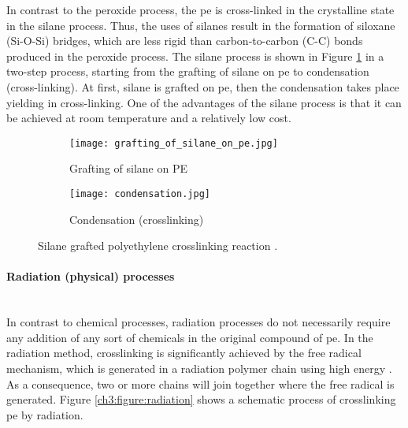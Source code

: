 In contrast to the peroxide process, the \acrshort{pe} is cross-linked in the crystalline state in the silane process. Thus, the uses of silanes result in the formation of siloxane (Si-O-Si) bridges, which are less rigid than carbon-to-carbon (C-C) bonds produced in the peroxide process. The silane process is shown in Figure \ref{ch3:figure:reaction} in a two-step process, starting from the grafting of silane on \acrshort{pe} to condensation (cross-linking). At first, silane is grafted on \acrshort{pe}, then the condensation takes place yielding in cross-linking. One of the advantages of the silane process is that it can be achieved at room temperature and a relatively low cost.

\begin{figure}[H]
\captionsetup[subfigure]{justification=raggedright}
\centering

\begin{subfigure}{.9\textwidth}
    \centering
    \texttt{[image: grafting\_of\_silane\_on\_pe.jpg]}
    \caption{Grafting of silane on PE}
\end{subfigure}
\begin{subfigure}{.9\textwidth}
    \vspace{1.2em}
    \centering
    \texttt{[image: condensation.jpg]}
    \caption{Condensation (crosslinking)}
\end{subfigure}

\caption{Silane grafted polyethylene crosslinking reaction \cite{kurtz2009cross}.}
\label{ch3:figure:reaction}
\end{figure}

\paragraph{Radiation (physical) processes} \hfill \\
In contrast to chemical processes, radiation processes do not necessarily require any addition of any sort of chemicals in the original compound of \acrshort{pe}. In the radiation method, crosslinking is significantly achieved by the free radical mechanism, which is generated in a radiation polymer chain using high energy \cite{peacock2000handbook}. As a consequence, two or more chains will join together where the free radical is generated. Figure \ref{ch3:figure:radiation} shows a schematic process of crosslinking \acrshort{pe} by radiation.

